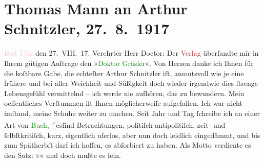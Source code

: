 

               \section[Thomas Mann an Arthur Schnitzler, 27. 8. 1917]{ Thomas Mann an Arthur Schnitzler, 27. 8. 1917}\nopagebreak{}\rehead{ }\normalsize\beginnumbering{} \toendnotes[C]{\smallbreak\pagebreak[2]} 
\toendnotes[C]{\smallbreak}\pstart
           \raggedleft{}{\pb}\textcolor{pink}{Bad Tölz}{}\ledrightnote{\textcolor{pink}{Bad Tölz}} den
                  27. VIII. 17.\pend
           \pstart{}Verehrter Herr Doctor:\pend\pstart
           Der \textcolor{brown}{Verlag}{} überſandte mir in Ihrem
               gütigen Auftrage den »\textcolor{green}{Doktor Gräsler}{}\ledrightnote{\textcolor{green}{Doktor Gräsler, Badearzt}}«. Von Herzen
               danke ich Ihnen für die koſtbare Gabe, die echteſter Arthur Schnitzler iſt,
               anmutsvoll wie je eine frühere und bei aller Weichheit und Süßigkeit doch wieder  irgendwie dies ſtrenge Lebensgefühl vermittelnd –
               ich werde nie aufhören, das zu bewundern.\pend
           \pstart
           Mein oeffentliches Verſtummen iſt Ihnen {\pb}möglicherweiſe aufgefallen. Ich war nicht imſtand, meine Schuhe weiter zu machen.
               Seit Jahr und Tag ſchreibe ich an einer Art von \textcolor{green}{Buch}{}, \substVorne{}\textsuperscript{\textcolor{gray}{×}}\substDazwischen{}es\substHinten{}{ }ſind Betrachtungen, politiſch-antipolitiſch, zeit-
               und ſelbſtkritiſch, kurz, eigentlich uferlos, aber nun doch leidlich eingedämmt, und
               bis zum Spätherbſt darf ich hoffen, es abſorbiert zu haben. Als Motto verdiente es
               den Satz: »\label{K_L02270_1v}\label{K_L02270_1h}« und doch mußte es ſein.\pend
